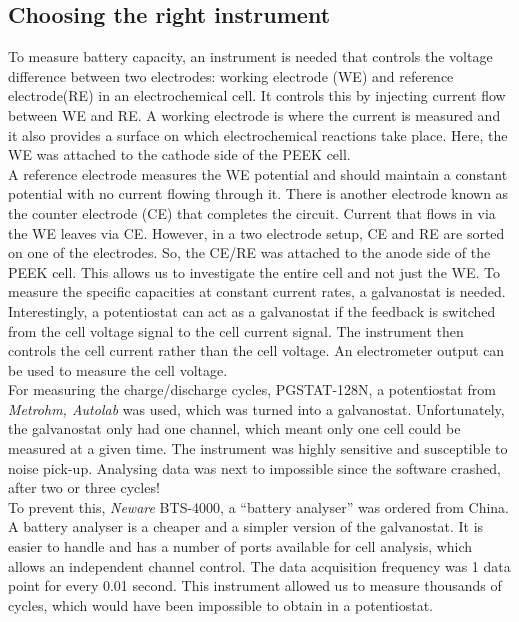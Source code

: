 \subsection*{Choosing the right instrument}
To measure battery capacity, an instrument is needed that controls the voltage difference between two electrodes: working electrode (WE) and reference electrode(RE) in an electrochemical cell. It controls this by injecting current flow between WE and RE. A working electrode is where the current is measured and it also provides a surface on which electrochemical reactions take place. Here, the WE was attached to the cathode side of the PEEK cell. \\ A reference electrode measures the WE potential and should maintain a constant potential with no current flowing through it. There is another electrode known as the counter electrode (CE) that completes the circuit. Current that flows in via the WE leaves via CE. However, in a two electrode setup, CE and RE are sorted on one of the electrodes. So, the CE/RE was attached to the anode side of the PEEK cell. This allows us to investigate the entire cell and not just the WE. To measure the specific capacities at constant current rates, a galvanostat is needed. Interestingly, a potentiostat can act as a galvanostat if the feedback is switched from the cell voltage signal to the cell current signal. The instrument then controls the cell current rather than the cell voltage. An electrometer output can be used to measure the cell voltage. \\
For measuring the charge/discharge cycles, PGSTAT-128N, a potentiostat from \textit{Metrohm, Autolab} was used, which was turned into a galvanostat. Unfortunately, the galvanostat only had one channel, which meant only one cell could be measured at a given time. The instrument was highly sensitive and susceptible to noise pick-up. Analysing data was next to impossible since the software crashed, after two or three cycles! \\
To prevent this, \textit{Neware} BTS-4000, a \enquote{battery analyser} was ordered from China. A battery analyser is a cheaper and a simpler version of the galvanostat. It is easier to handle and has a number of ports available for cell analysis, which allows an independent channel control. The data acquisition frequency was 1 data point for every 0.01 second. This instrument allowed us to measure thousands of cycles, which would have been impossible to obtain in a potentiostat. 

